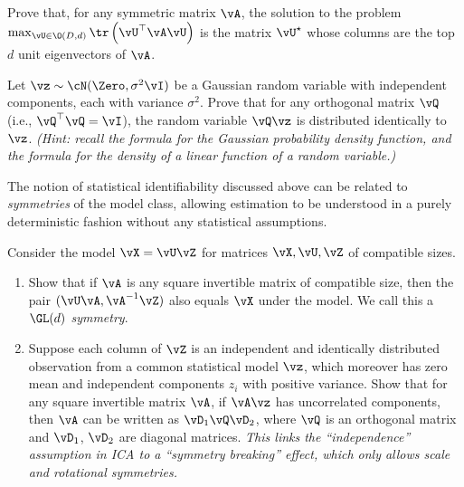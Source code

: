 \documentclass[../../book-main.tex]{subfiles}
\begin{document}
\begin{exercise}\label{exercise:principal-components-derivation}
    Prove that, for any symmetric matrix \(\vA\), the solution to the problem
    \(\max_{\vU \in \O(D, d)}\tr\left(\vU^{\top}\vA\vU\right)\) is the matrix
    \(\vU^{\star}\) whose columns are the top \(d\) unit eigenvectors of \(\vA\).
\end{exercise}

\begin{exercise}\label{exercise:gaussian-rot-invar}
    Let $\vz \sim \cN(\Zero, \sigma^2 \vI)$ be a Gaussian random variable with independent components, each with variance $\sigma^2$. 
    Prove that for any orthogonal matrix $\vQ$ (i.e., $\vQ^\top \vQ = \vI$), the random variable $\vQ \vz$ is distributed identically to $\vz$. 
    \textit{(Hint: recall the formula for the Gaussian probability density function, and the formula for the density of a linear function of a random variable.) }
\end{exercise}

\begin{exercise}\label{exercise:symmetry-identifiability}
    The notion of statistical identifiability discussed above can be related to \textit{symmetries} of the model class, allowing estimation to be understood in a purely deterministic fashion without any statistical assumptions.

    Consider the model $\vX = \vU \vZ$ for matrices $\vX, \vU, \vZ$ of compatible sizes.
    \begin{enumerate}
        \item Show that if $\vA$ is any square invertible matrix of compatible size, then the pair
        $(\vU \vA, \vA^{-1} \vZ)$ also equals $\vX$ under the model. We call this a \textit{$\GL(d)$ symmetry}.
        \item Suppose each column of $\vZ$ is an independent and identically distributed observation from a common statistical model $\vz$, which moreover has zero mean and independent components $z_i$ with positive variance.
        Show that for any square invertible matrix $\vA$, if $\vA \vz$ has uncorrelated components, then $\vA$ can be written as $\vD_1 \vQ \vD_2$, where $\vQ$ is an orthogonal matrix and $\vD_1$, $\vD_2$ are diagonal matrices.
        \textit{This links the ``independence'' assumption in ICA to a ``symmetry breaking'' effect, which only allows scale and rotational symmetries.}
    \end{enumerate}

\end{exercise}
\end{document}
